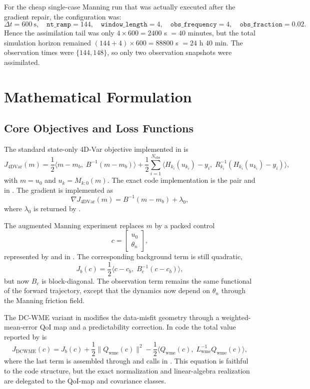 \documentclass[11pt]{article}
\begin{document}
For the cheap single-case Manning run that was actually executed after the gradient repair, the configuration was:
\[
\Delta t = 600\ \text{s},\quad \texttt{nt\_ramp}=144,\quad \texttt{window\_length}=4,\quad \texttt{obs\_frequency}=4,\quad \texttt{obs\_fraction}=0.02.
\]
Hence the assimilation tail was only $4 \times 600 = 2400$ s $= 40$ minutes, but the total simulation horizon remained $(144+4)\times 600 = 88800$ s $=24$ h $40$ min. The observation times were $\{144,148\}$, so only two observation snapshots were assimilated.

\section{Mathematical Formulation}
\subsection{Core Objectives and Loss Functions}
The standard state-only 4D-Var objective implemented in  is
\[
J_{\mathrm{4DVar}}(m)
= \frac12 \langle m-m_b,\; B^{-1}(m-m_b)\rangle
 + \frac12 \sum_{i=1}^{N_{\mathrm{obs}}}
\langle H_{k_i}(u_{k_i})-y_i,\; R_{k_i}^{-1}(H_{k_i}(u_{k_i})-y_i)\rangle,
\]
with $m=u_0$ and $u_k = M_{k:0}(m)$. The exact code implementation is the pair  and  in . The gradient is implemented as
\[
\nabla J_{\mathrm{4DVar}}(m) = B^{-1}(m-m_b) + \lambda_0,
\]
where $\lambda_0$ is returned by .

The augmented Manning experiment replaces $m$ by a packed control
\[
c = \begin{bmatrix}u_0 \\ \theta_n\end{bmatrix},
\]
represented by  and  in . The corresponding background term is still quadratic,
\[
J_b(c)=\frac12 \langle c-c_b,\; B_c^{-1}(c-c_b)\rangle,
\]
but now $B_c$ is block-diagonal. The observation term remains the same functional of the forward trajectory, except that the dynamics now depend on $\theta_n$ through the Manning friction field.

The DC-WME variant in  modifies the data-misfit geometry through a weighted-mean-error QoI map and a predictability correction. In code the total value reported by  is
\[
J_{\mathrm{DCWME}}(c)
= J_b(c) + \frac12 \|Q_{\mathrm{wme}}(c)\|^2
 - \frac12 \langle Q_{\mathrm{wme}}(c),\; L_{\mathrm{wme}}^{-1}Q_{\mathrm{wme}}(c)\rangle,
\]
where the last term is assembled through  and  calls in . This equation is faithful to the code structure, but the exact normalization and linear-algebra realization are delegated to the QoI-map and covariance classes.
\end{document}
